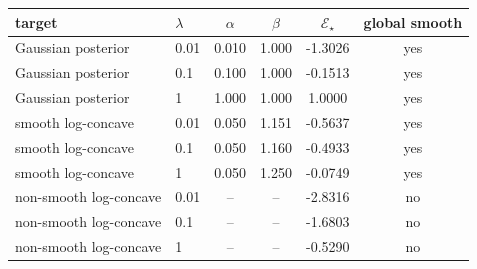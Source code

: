 \begin{tabular}{llcccc}
\toprule
target & $\lambda$ & $\alpha$ & $\beta$ & $\mathcal{E}_\star$ & global smooth \\
\midrule
Gaussian posterior & 0.01 & 0.010 & 1.000 & -1.3026 & yes \\
Gaussian posterior & 0.1 & 0.100 & 1.000 & -0.1513 & yes \\
Gaussian posterior & 1 & 1.000 & 1.000 & 1.0000 & yes \\
smooth log-concave & 0.01 & 0.050 & 1.151 & -0.5637 & yes \\
smooth log-concave & 0.1 & 0.050 & 1.160 & -0.4933 & yes \\
smooth log-concave & 1 & 0.050 & 1.250 & -0.0749 & yes \\
non-smooth log-concave & 0.01 & -- & -- & -2.8316 & no \\
non-smooth log-concave & 0.1 & -- & -- & -1.6803 & no \\
non-smooth log-concave & 1 & -- & -- & -0.5290 & no \\
\bottomrule
\end{tabular}
